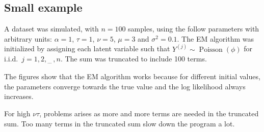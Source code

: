 \documentclass[12pt]{report}
\DeclareMathOperator{\poisson}{Poisson}
\newcommand{\dotdotdot}{_{\phantom{.}\cdots}}
\begin{document}
\subsection{Small example}
A dataset was simulated, with $n=100$ samples, using the follow parameters with arbitrary units: $\alpha=1$, $\tau=1$, $\nu=5$, $\mu=3$ and $\sigma^2=0.1$. The EM algorithm was initialized by assigning each latent variable such that $Y^{(j)}\sim\poisson(\phi)$ for i.i.d.~$j=1,2,\dotdotdot,n$. The sum was truncated to include 100 terms.

The figures show that the EM algorithm works because for different initial values, the parameters converge towards the true value and the log likelihood always increases.

For high $\nu\tau$, problems arises as more and more terms are needed in the truncated sum. Too many terms in the truncated sum slow down the program a lot.
\end{document}
